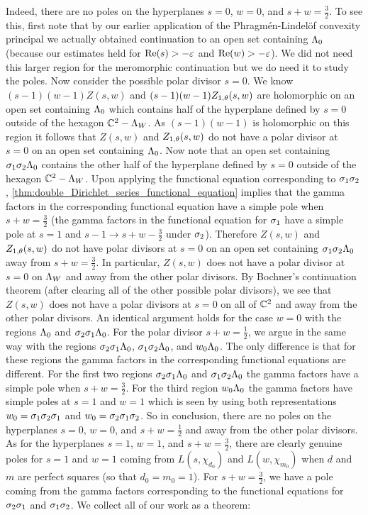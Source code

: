 \documentclass[12pt,reqno,oneside]{amsart}
\begin{document}
    Indeed, there are no poles on the hyperplanes $s = 0$, $w = 0$, and $s+w = \frac{3}{2}$. To see this, first note that by our earlier application of the Phragm\'en-Lindel\"of convexity principal we actually obtained continuation to an open set containing $\Lambda_{0}$ (because our estimates held for $\mathrm{Re}(s) > -\varepsilon$ and $\mathrm{Re}(w) > -\varepsilon$). We did not need this larger region for the meromorphic continuation but we do need it to study the poles. Now consider the possible polar divisor $s = 0$. We know $(s-1)(w-1)Z(s,w)$ and $(s-1)(w-1)Z_{1,\theta}(s,w)$ are holomorphic on an open set containing $\Lambda_{0}$ which contains half of the hyperplane defined by $s = 0$ outside of the hexagon $\mathbb{C}^{2}-\Lambda_{W}$. As $(s-1)(w-1)$ is holomorphic on this region it follows that $Z(s,w)$ and $Z_{1,\theta}(s,w)$ do not have a polar divisor at $s = 0$ on an open set containing $\Lambda_{0}$. Now note that an open set containing $\sigma_{1}\sigma_{2}\Lambda_{0}$ contains the other half of the hyperplane defined by $s = 0$ outside of the hexagon $\mathbb{C}^{2}-\Lambda_{W}$. Upon applying the functional equation corresponding to $\sigma_{1}\sigma_{2}$, \cref{thm:double_Dirichlet_series_functional_equation} implies that the gamma factors in the corresponding functional equation have a simple pole when $s+w = \frac{3}{2}$ (the gamma factors in the functional equation for $\sigma_{1}$ have a simple pole at $s = 1$ and $s-1 \to s+w-\frac{3}{2}$ under $\sigma_{2}$). Therefore $Z(s,w)$ and $Z_{1,\theta}(s,w)$ do not have polar divisors at $s = 0$ on an open set containing $\sigma_{1}\sigma_{2}\Lambda_{0}$ away from $s+w = \frac{3}{2}$. In particular, $Z(s,w)$ does not have a polar divisor at $s = 0$ on $\Lambda_{W}$ and away from the other polar divisors. By Bochner's continuation theorem (after clearing all of the other possible polar divisors), we see that $Z(s,w)$ does not have a polar divisors at $s = 0$ on all of $\mathbb{C}^{2}$ and away from the other polar divisors. An identical argument holds for the case $w = 0$ with the regions $\Lambda_{0}$ and $\sigma_{2}\sigma_{1}\Lambda_{0}$. For the polar divisor $s+w = \frac{1}{2}$, we argue in the same way with the regions $\sigma_{2}\sigma_{1}\Lambda_{0}$, $\sigma_{1}\sigma_{2}\Lambda_{0}$, and $w_{0}\Lambda_{0}$. The only difference is that for these regions the gamma factors in the corresponding functional equations are different. For the first two regions $\sigma_{2}\sigma_{1}\Lambda_{0}$ and $\sigma_{1}\sigma_{2}\Lambda_{0}$ the gamma factors have a simple pole when $s+w = \frac{3}{2}$. For the third region $w_{0}\Lambda_{0}$ the gamma factors have simple poles at $s = 1$ and $w = 1$ which is seen by using both representations $w_{0} = \sigma_{1}\sigma_{2}\sigma_{1}$ and $w_{0} = \sigma_{2}\sigma_{1}\sigma_{2}$. So in conclusion, there are no poles on the hyperplanes $s = 0$, $w = 0$, and $s+w = \frac{1}{2}$ and away from the other polar divisors. As for the hyperplanes $s = 1$, $w = 1$, and $s+w = \frac{3}{2}$, there are clearly genuine poles for $s = 1$ and $w = 1$ coming from $L(s,\chi_{d_{0}})$ and $L(w,\chi_{m_{0}})$ when $d$ and $m$ are perfect squares (so that $d_{0} = m_{0} = 1$). For $s+w = \frac{3}{2}$, we have a pole coming from the gamma factors corresponding to the functional equations for $\sigma_{2}\sigma_{1}$ and $\sigma_{1}\sigma_{2}$. We collect all of our work as a theorem:
\end{document}

